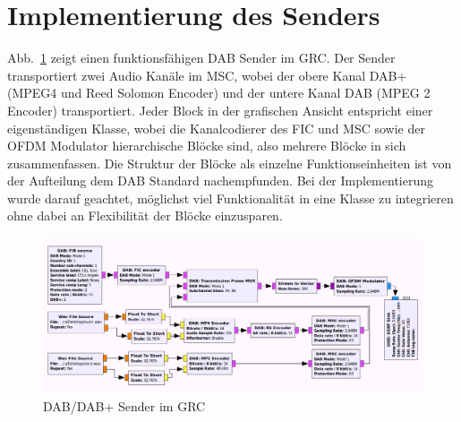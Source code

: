 \section{Implementierung des Senders}
\label{sec:imp_des_transmitters}
Abb.~\ref{fig:transmitter} zeigt einen funktionsfähigen DAB Sender im GRC. Der Sender transportiert zwei Audio Kanäle im MSC, wobei der obere Kanal DAB+ (MPEG4 und Reed Solomon Encoder) und der untere Kanal DAB (MPEG 2 Encoder) transportiert. Jeder Block in der grafischen Ansicht entspricht einer eigenständigen Klasse, wobei die Kanalcodierer des FIC und MSC sowie der OFDM Modulator hierarchische Blöcke sind, also mehrere Blöcke in sich zusammenfassen. Die Struktur der Blöcke als einzelne Funktionseinheiten ist von der Aufteilung dem DAB Standard nachempfunden. Bei der Implementierung wurde darauf geachtet, möglichst viel Funktionalität in eine Klasse zu integrieren ohne dabei an Flexibilität der Blöcke einzusparen.

\begin{figure}[ht]
\centering
  \includegraphics[width=\textwidth]{figures/GRC_transmitter.png}
	\caption{DAB/DAB+ Sender im GRC}
	\label{fig:transmitter}
\end{figure}

